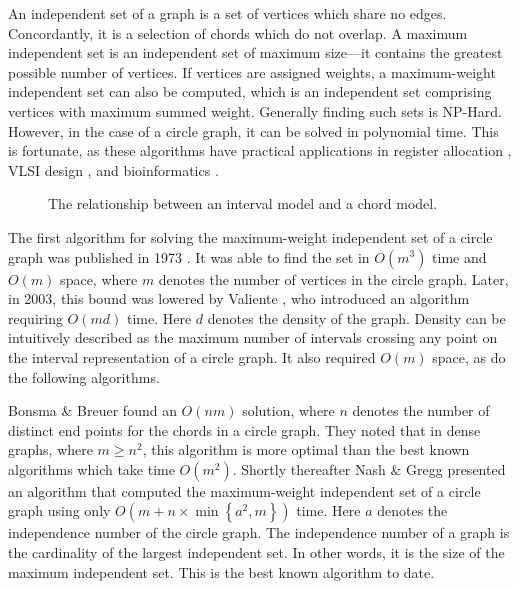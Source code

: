 \documentclass[12pt, a4paper]{article}
\begin{document}
An independent set of a graph is a set of vertices which share no edges. Concordantly, it is a selection of chords which do not overlap. A maximum independent set is an independent set of maximum size---it contains the greatest possible number of vertices. If vertices are assigned weights, a maximum-weight independent set can also be computed, which is an independent set comprising vertices with maximum summed weight. Generally finding such sets is NP-Hard. However, in the case of a circle graph, it can be solved in polynomial time. This is fortunate, as these algorithms have practical applications in register allocation \cite{de1999graph}, VLSI design \cite{cong1990over}, and bioinformatics \cite{swenson2009maximum}.

\begin{figure}
\begin{center}
\end{center}
\caption{The relationship between an interval model and a chord model.}
\label{interval2circle}
\end{figure}

The first algorithm for solving the maximum-weight independent set of a circle graph was published in 1973 \cite{gavril1973algorithms}. It was able to find the set in $O(m^3)$ time and $O(m)$ space, where $m$ denotes the number of vertices in the circle graph. Later, in 2003, this bound was lowered by Valiente \cite{valiente2003new}, who introduced an algorithm requiring $O(md)$ time. Here $d$ denotes the density of the graph. Density can be intuitively described as the maximum number of intervals crossing any point on the interval representation of a circle graph.  It also required $O(m)$ space, as do the following algorithms.

Bonsma \& Breuer \cite{bonsma2012counting} found an $O(nm)$ solution, where $n$ denotes the number of distinct end points for the chords in a circle graph. They noted that in dense graphs, where $m \geq n^2$, this algorithm is more optimal than the best known algorithms which take time $O(m^2)$. Shortly thereafter Nash \& Gregg \cite{nash2013new} presented an algorithm that computed the maximum-weight independent set of a circle graph using only $O(m + n\times \min \left\lbrace a^2, m\right\rbrace)$ time. Here $a$ denotes the independence number of the circle graph. The independence number of a graph is the cardinality of the largest independent set. In other words, it is the size of the maximum independent set. This is the best known algorithm to date.
\end{document}
